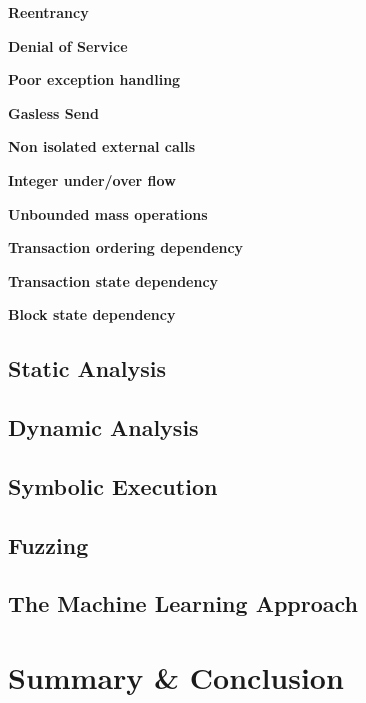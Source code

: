 \documentclass[a4paper,11pt]{article}
\begin{document}
\textbf{Reentrancy}

\textbf{Denial of Service}

\textbf{Poor exception handling}

\textbf{Gasless Send}

\textbf{Non isolated external calls}

\textbf{Integer under/over flow}

\textbf{Unbounded mass operations}

\textbf{Transaction ordering dependency}

\textbf{Transaction state dependency}

\textbf{Block state dependency}

\pagebreak

\subsection{Static Analysis}

\subsection{Dynamic Analysis}

\subsection{Symbolic Execution}

\subsection{Fuzzing}

\subsection{The Machine Learning Approach}

\section{Summary \& Conclusion}

\nocite{*}



\small

\end{document}
